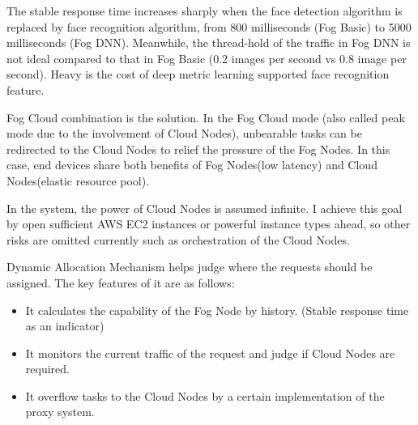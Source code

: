 The stable response time increases sharply when the face detection algorithm is replaced by face recognition algorithm, from 800 milliseconds (Fog Basic) to 5000 milliseconds (Fog DNN). Meanwhile, the thread-hold of the traffic in Fog DNN is not ideal compared to that in Fog Basic (0.2 images per second vs 0.8 image per second). Heavy is the cost of deep metric learning supported face recognition feature.

Fog Cloud combination is the solution. In the Fog Cloud mode (also called peak mode due to the involvement of Cloud Nodes), unbearable tasks can be redirected to the Cloud Nodes to relief the pressure of the Fog Nodes. In this case, end devices share both benefits of Fog Nodes(low latency) and Cloud Nodes(elastic resource pool). 

In the system, the power of Cloud Nodes is assumed infinite. I achieve this goal by open sufficient AWS EC2 instances or powerful instance types ahead, so other risks are omitted currently such as orchestration of the Cloud Nodes.

Dynamic Allocation Mechanism helps judge where the requests should be assigned. The key features of it are as follows:
\begin{itemize}
    \item It calculates the capability of the Fog Node by history. (Stable response time as an indicator)
    \item It monitors the current traffic of the request and judge if Cloud Nodes are required.
    \item It overflow tasks to the Cloud Nodes by a certain implementation of the proxy system.
\end{itemize}